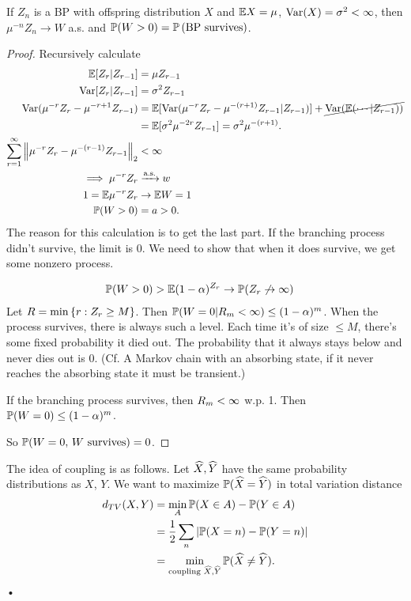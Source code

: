 \begin{lem}
If $Z_n$ is a BP with offspring distribution $X$ and $\mathbb{E} X=\mu$, $\operatorname{Var}(X)=\sigma^2<\infty$, then $\mu^{-n} Z_n\to W$ a.s. and $\mathbb{P}(W>0)=\mathbb{P}\left( \text{BP survives} \right)$. 
\end{lem}
\begin{proof}
Recursively calculate
\begin{align}
\E[Z_r|Z_{r-1}]&=\mu Z_{r-1}\\
\Var[Z_r|Z_{r-1}]%
&=\si^2 Z_{r-1}\\
\Var(\mu^{-r} Z_r - \mu^{-r+1}Z_{r-1})
&= \E [\Var(\mu^{-r}Z_r - \mu^{-(r+1)}Z_{r-1}|Z_{r-1})]
+ \cancel{\Var(\E(\cdots | Z_{r-1}))}\\
&= \E[\si^2 \mu^{-2r} Z_{r-1}] = \si^2 \mu^{-(r+1)}.\\
\sumo r{\iy} \ve{\mu^{-r} Z_r - \mu^{-(r-1)}Z_{r-1}}_2 &<\iy\\
\implies \mu^{-r}Z_r &\xra{\text{a.s.}}w\\
1 = \E \mu^{-r}Z_r &\to \E W=1\\
\Pj(W>0) &=a>0.
\end{align}
The reason for this calculation is to get the last part.
If the branching process didn't survive, the limit is 0. We need to show that when it does survive, we get some nonzero process.

\begin{align}
\mathbb{P}(W>0) &>\mathbb{E}(1-\alpha)^{Z_r}\to \mathbb{P}(Z_r\not\to \infty)
\end{align}
Let $R=\min\left\{{r}:{Z_r\ge M}\right\}$. Then $\mathbb{P}(W=0|R_m<\infty) \le (1-\alpha)^m$. 
When the process survives, there is always such a level. Each time it's of size $\le M$, there's some fixed probability it died out. The probability that it always stays below and never dies out is 0. (Cf. A Markov chain with an absorbing state, if it never reaches the absorbing state it must be transient.)

If the branching process survives, then $R_m<\infty$ w.p. 1. Then $\mathbb{P}(W=0)\le (1-\alpha)^m$.

So $\mathbb{P}(W=0,\,W\text{ survives})=0$.
\end{proof}


The idea of coupling is as follows. Let $\widehat{X}, \widehat{Y}$ have the same probability distributions as $X$, $Y$. %
We want to maximize $\mathbb{P}(\widehat{X}=\widehat{Y})$ in total variation distance
\begin{align}
d_{TV}(X,Y) &=\min_A \mathbb{P}(X\in A)-\mathbb{P}(Y\in A)\\
&=\frac{1}{2} \sum_n |\mathbb{P}(X=n) - \mathbb{P}(Y=n)|\\
&= \min_{\text{coupling }\widehat{X},\widehat{Y}} \mathbb{P}(\widehat{X} \ne \widehat{Y}).
\end{align}•

